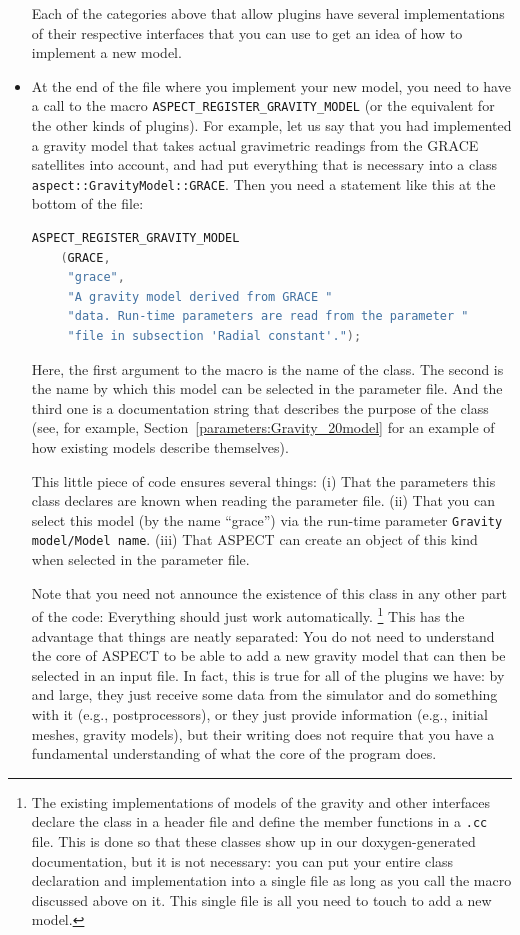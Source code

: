 \documentclass{article}
\newcommand{\aspect}{\textsc{ASPECT}}
\begin{document}
\begin{itemize}
  Each of the categories above that allow plugins have several implementations
  of their respective interfaces that you can use to get an idea of how to
  implement a new model.

\item At the end of the file where you implement your new model, you need to
  have a call to the macro \texttt{ASPECT\_REGISTER\_GRAVITY\_MODEL} (or the
  equivalent for the other kinds of plugins). For
  example, let us say that you had implemented a gravity model that takes
  actual gravimetric readings from the GRACE satellites into account, and had
  put everything that is necessary into a class
  \texttt{aspect::GravityModel::GRACE}. Then you need a statement like this at
  the bottom of the file:
  \begin{lstlisting}[frame=single,language=C++]
    ASPECT_REGISTER_GRAVITY_MODEL
    (GRACE,
     "grace",
     "A gravity model derived from GRACE "
     "data. Run-time parameters are read from the parameter "
     "file in subsection 'Radial constant'.");
  \end{lstlisting}
  Here, the first argument to the macro is the name of the class. The second
  is the name by which this model can be selected in the parameter file. And
  the third one is a documentation string that describes the purpose of the
  class (see, for example, Section~\ref{parameters:Gravity_20model} for an
  example of how existing models describe themselves).

  This little piece of code ensures several things: (i) That the parameters
  this class declares are known when reading the parameter file. (ii) That you
  can select this model (by the name ``grace'') via the run-time parameter
  \texttt{Gravity model/Model name}. (iii) That \aspect{} can create an object
  of this kind when selected in the parameter file.

  Note that you need not announce the existence of this class in any other
  part of the code: Everything should just work automatically.%
  \footnote{The existing implementations of models of the gravity and other interfaces
  declare the class in a header file and define the member functions in a
  \texttt{.cc} file. This is done so that these classes show up in our
  doxygen-generated documentation, but it is not necessary: you can put your
  entire class declaration and implementation into a single file as long as
  you call the macro discussed above on it. This single file is all you need
  to touch to add a new model.}
  This has the advantage that things are neatly separated: You do not need to
  understand the core of \aspect{} to be able to add a new gravity model that
  can then be selected in an input file. In fact, this is true for
  all of the plugins we have: by and large, they just receive some data
  from the simulator and do something with it (e.g., postprocessors), or they
  just provide information (e.g., initial meshes, gravity models), but their
  writing does not require that you have a fundamental understanding
  of what the core of the program does.
\end{itemize}
\end{document}

